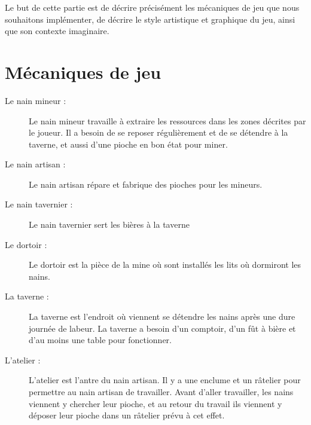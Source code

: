 \documentclass[a4paper]{report}
\begin{document}
Le but de cette partie est de décrire précisément les mécaniques de jeu que nous souhaitons implémenter, de décrire le style artistique et graphique du jeu, ainsi que son contexte imaginaire.

\vspace{0.2cm}
\chapter*{Mécaniques de jeu}

\vspace{0.2cm}
\vspace{0.2cm}

\begin{description}
\item[Le nain mineur :]Le nain mineur travaille à extraire les ressources dans les zones décrites par le joueur. Il a besoin de se reposer régulièrement et de se détendre à la taverne, et aussi d'une pioche en bon état pour miner.
\item[Le nain artisan :]Le nain artisan répare et fabrique des pioches pour les mineurs.
\item[Le nain tavernier :]Le nain tavernier sert les bières à la taverne
\end{description}

\vspace{0.2cm}
\vspace{0.2cm}

\begin{description}
\item[Le dortoir :]Le dortoir est la pièce de la mine où sont installés les lits où dormiront les nains.
\item[La taverne :] La taverne est l'endroit où viennent se détendre les nains après une dure journée de labeur.  La taverne a besoin d'un comptoir, d'un fût à bière et d'au moins une table pour fonctionner.
\item[L'atelier :] L'atelier est l'antre du nain artisan. Il y a une enclume et un râtelier pour permettre au nain artisan de travailler. Avant d'aller travailler, les nains viennent y chercher leur pioche, et au retour du travail ils viennent y déposer leur pioche dans un râtelier prévu à cet effet.
\end{description}

\vspace{0.2cm}
\vspace{0.2cm}
\end{document}
